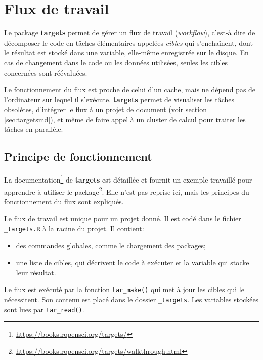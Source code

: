 \documentclass[
  12pt,
  french,
  a4paper,
  extrafontsizes,onecolumn,openright
  ]{memoir}
\providecommand{\tightlist}{%
  \setlength{\itemsep}{0pt}\setlength{\parskip}{0pt}}
\begin{document}
\hypertarget{sec:targets}{%
\section{Flux de travail}\label{sec:targets}}

Le package \textbf{targets} permet de gérer un flux de travail (\emph{workflow}), c'est-à dire de décomposer le code en tâches élémentaires appelées \emph{cibles} qui s'enchaînent, dont le résultat est stocké dans une variable, elle-même enregistrée sur le disque.
En cas de changement dans le code ou les données utilisées, seules les cibles concernées sont réévaluées.

Le fonctionnement du flux est proche de celui d'un cache, mais ne dépend pas de l'ordinateur sur lequel il s'exécute.
\textbf{targets} permet de visualiser les tâches obsolètes, d'intégrer le flux à un projet de document (voir section \ref{sec:targetsmd}), et même de faire appel à un cluster de calcul pour traiter les tâches en parallèle.

\hypertarget{principe-de-fonctionnement}{%
\subsection{Principe de fonctionnement}\label{principe-de-fonctionnement}}

La documentation\footnote{\url{https://books.ropensci.org/targets/}} de \textbf{targets} est détaillée et fournit un exemple travaillé pour apprendre à utiliser le package\footnote{\url{https://books.ropensci.org/targets/walkthrough.html}}.
Elle n'est pas reprise ici, mais les principes du fonctionnement du flux sont expliqués.

Le flux de travail est unique pour un projet donné.
Il est codé dans le fichier \texttt{\_targets.R} à la racine du projet.
Il contient:

\begin{itemize}
\tightlist
\item
  des commandes globales, comme le chargement des packages;
\item
  une liste de cibles, qui décrivent le code à exécuter et la variable qui stocke leur résultat.
\end{itemize}

Le flux est exécuté par la fonction \texttt{tar\_make()} qui met à jour les cibles qui le nécessitent.
Son contenu est placé dans le dossier \texttt{\_targets}.
Les variables stockées sont lues par \texttt{tar\_read()}.
\end{document}
